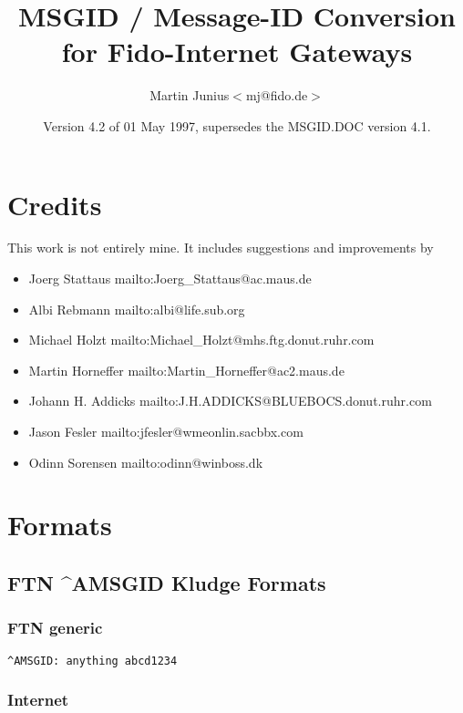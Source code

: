 \documentclass[letterpaper]{article}
\title{MSGID / Message-ID Conversion for Fido-Internet Gateways }
\author{Martin Junius{\ttfamily  $<$mj@fido.de$>$} }
\date{Version 4.2 of 01 May 1997, supersedes the MSGID.DOC version 4.1.}
\begin{document}
\maketitle

\section{Credits }



This work is not entirely mine. It includes suggestions and improvements by 
\begin{itemize}
\item Joerg Stattaus 
mailto:Joerg\_Stattaus@ac.maus.de 
\item Albi Rebmann 
mailto:albi@life.sub.org 
\item Michael Holzt 
mailto:Michael\_Holzt@mhs.ftg.donut.ruhr.com 
\item Martin Horneffer 
mailto:Martin\_Horneffer@ac2.maus.de 
\item Johann H. Addicks 
mailto:J.H.ADDICKS@BLUEBOCS.donut.ruhr.com 
\item Jason Fesler 
mailto:jfesler@wmeonlin.sacbbx.com 
\item Odinn Sorensen 
mailto:odinn@winboss.dk  
\end{itemize}



\section{Formats }




\subsection{FTN \^{}AMSGID Kludge Formats }




\subsubsection{FTN generic }

\begin{verbatim}
^AMSGID: anything abcd1234 
\end{verbatim}



\subsubsection{Internet }
\end{document}
